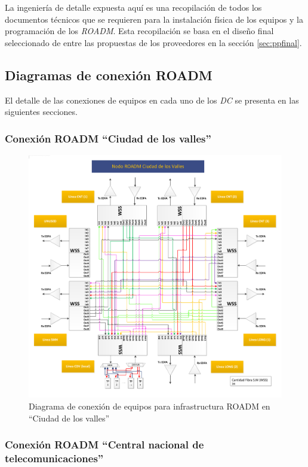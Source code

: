 La ingeniería de detalle expuesta aquí es una recopilación de todos
los documentos técnicos que se requieren para la instalación física de
los equipos y la programación de los \emph{ROADM}. Esta recopilación
se basa en el diseño final seleccionado de entre las propuestas de los
proveedores en la sección \ref{sec:ppfinal}.

\subsection{Diagramas de conexión ROADM}
\label{sec:diagramasroadm}

El detalle de las conexiones de equipos en cada uno de los \emph{DC}
se presenta en las siguientes secciones.

\subsubsection{Conexión ROADM ``Ciudad de los valles''}
\label{sec:drcdv}

\begin{figure}[H]
  \centering
  \includegraphics[width=17cm]{Imagenes/CDV.pdf}
  \caption{Diagrama de conexión de equipos para infrastructura ROADM
    en ``Ciudad de los valles''}
  \label{fig:drcdv}
\end{figure}

\subsubsection{Conexión ROADM ``Central nacional de
  telecomunicaciones''}
\label{sec:drcnt}

